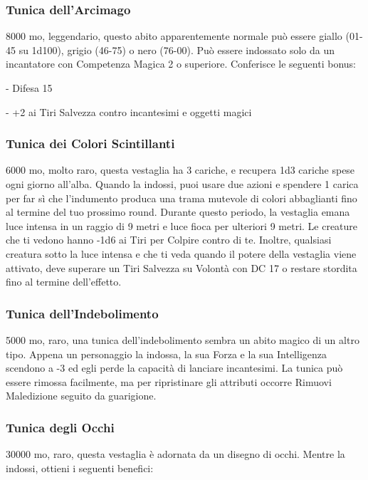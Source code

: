 \begin{multicols}{2}
	\subsubsection*{Tunica dell’Arcimago}
	8000 mo, leggendario, questo abito apparentemente normale può essere giallo (01-45 su 1d100), grigio (46-75) o nero (76-00). Può essere indossato solo da un incantatore con Competenza Magica 2 o superiore. Conferisce le seguenti bonus:

	- Difesa 15

	- +2 ai Tiri Salvezza contro incantesimi e oggetti magici

	\subsubsection*{Tunica dei Colori Scintillanti}
	6000 mo, molto raro, questa vestaglia ha 3 cariche, e recupera 1d3 cariche spese ogni giorno all'alba. Quando la indossi, puoi usare due azioni e spendere 1 carica per far sì che l'indumento produca una trama mutevole di colori abbaglianti fino al termine del tuo prossimo round. Durante questo periodo, la vestaglia emana luce intensa in un raggio di 9 metri e luce fioca per ulteriori 9 metri. Le creature che ti vedono hanno -1d6 ai Tiri per Colpire contro di te. Inoltre, qualsiasi creatura sotto la luce intensa e che ti veda quando il potere della vestaglia viene attivato, deve superare un Tiri Salvezza su Volontà con DC 17 o restare stordita fino al termine dell'effetto.

	\subsubsection*{Tunica dell’Indebolimento}
	5000 mo, raro, una tunica dell’indebolimento sembra un abito magico di un altro tipo. Appena un personaggio la indossa, la sua Forza e la sua Intelligenza scendono a -3 ed egli perde la capacità di lanciare incantesimi. La tunica può essere rimossa facilmente, ma per ripristinare gli attributi occorre Rimuovi Maledizione seguito da guarigione.

	\subsubsection*{Tunica degli Occhi}
	30000 mo, raro, questa vestaglia è adornata da un disegno di occhi. Mentre la indossi, ottieni i seguenti benefici:


\end{multicols}
